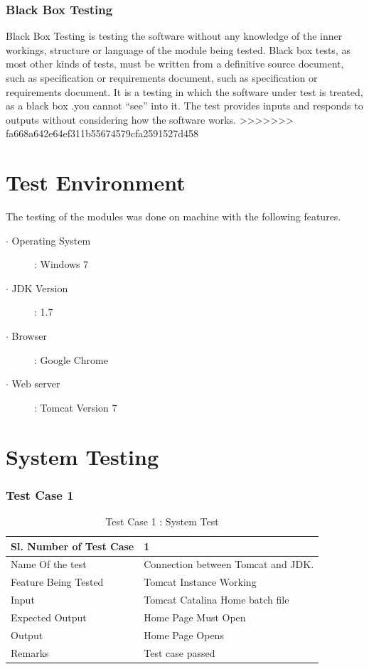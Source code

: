 \documentclass[12pt]{report}
\begin{document}
\subsubsection{Black Box Testing}
Black Box Testing is testing the software without any knowledge of the inner
workings, structure or language of the module being tested. Black box tests, as most
other kinds of tests, must be written from a definitive source document, such as
specification or requirements document, such as specification or requirements
document. It is a testing in which the software under test is treated, as a black box
.you cannot “see” into it. The test provides inputs and responds to outputs without
considering how the software works.
>>>>>>> fa668a642e64ef311b55674579cfa2591527d458
\section{Test Environment}
The testing of the modules was done on machine with the following features.
\begin{description}
  \item[$\cdot$ Operating System ] : Windows 7 
  \item[$\cdot$ JDK Version ] : 1.7 
  \item[$\cdot$ Browser ] : Google Chrome 
  \item[$\cdot$ Web server ]: Tomcat Version 7 
\end{description}
\newpage

\section{System Testing}
\subsubsection{Test Case 1}
\begin{table}
    \begin{tabular}{|l|l|}
    \hline
    Sl. Number of Test Case & 1                                  \\ \hline
    Name Of the test        & Connection between Tomcat and JDK. \\ \hline
    Feature Being Tested    & Tomcat Instance Working            \\ \hline
    Input                   & Tomcat Catalina Home batch file    \\ \hline
    Expected Output         & Home Page Must Open                \\ \hline
    Output                  & Home Page Opens                    \\ \hline
    Remarks                 & Test case passed                   \\ \hline
    \end{tabular}
    \caption {Test Case 1 : System Test}
\end{table}
\end{document}
